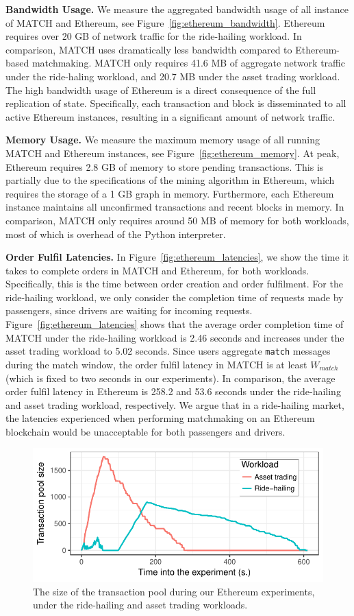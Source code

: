 \textbf{Bandwidth Usage.}
We measure the aggregated bandwidth usage of all instance of MATCH and Ethereum, see Figure~\ref{fig:ethereum_bandwidth}.
Ethereum requires over 20 GB of network traffic for the ride-hailing workload.
In comparison, MATCH uses dramatically less bandwidth compared to Ethereum-based matchmaking.
MATCH only requires 41.6 MB of aggregate network traffic under the ride-haling workload, and 20.7 MB under the asset trading workload.
The high bandwidth usage of Ethereum is a direct consequence of the full replication of state.
Specifically, each transaction and block is disseminated to all active Ethereum instances, resulting in a significant amount of network traffic.

\textbf{Memory Usage.}
We measure the maximum memory usage of all running MATCH and Ethereum instances, see Figure~\ref{fig:ethereum_memory}.
At peak, Ethereum requires 2.8 GB of memory to store pending transactions.
This is partially due to the specifications of the mining algorithm in Ethereum, which requires the storage of a 1 GB graph in memory.
Furthermore, each Ethereum instance maintains all unconfirmed transactions and recent blocks in memory.
In comparison, MATCH only requires around 50 MB of memory for both workloads, most of which is overhead of the Python interpreter.

\textbf{Order Fulfil Latencies.}
In Figure~\ref{fig:ethereum_latencies}, we show the time it takes to complete orders in MATCH and Ethereum, for both workloads.
Specifically, this is the time between order creation and order fulfilment.
For the ride-hailing workload, we only consider the completion time of requests made by passengers, since drivers are waiting for incoming requests.
Figure~\ref{fig:ethereum_latencies} shows that the average order completion time of MATCH under the ride-hailing workload is 2.46 seconds and increases under the asset trading workload to 5.02 seconds.
Since users aggregate \texttt{match} messages during the match window, the order fulfil latency in MATCH is at least $ W_{match} $ (which is fixed to two seconds in our experiments).
In comparison, the average order fulfil latency in Ethereum is 258.2 and 53.6 seconds under the ride-hailing and asset trading workload, respectively.
We argue that in a ride-hailing market, the latencies experienced when performing matchmaking on an Ethereum blockchain would be unacceptable for both passengers and drivers.

\begin{figure}[t]
	\centering
	\includegraphics[width=.8\linewidth]{match/assets/plots/tx_pool}
	\caption{The size of the transaction pool during our Ethereum experiments, under the ride-hailing and asset trading workloads.}
	\label{fig:ethereum_tx_pool}
\end{figure}

